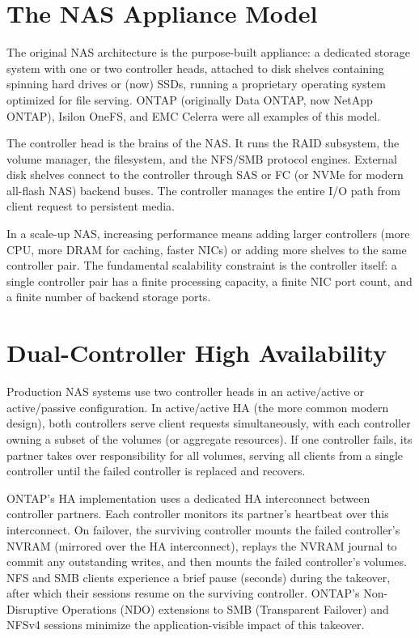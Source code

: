 \section{The NAS Appliance Model}
The original NAS architecture is the purpose-built appliance: a dedicated storage system with one or two controller heads, attached to disk shelves containing spinning hard drives or (now) SSDs, running a proprietary operating system optimized for file serving. ONTAP (originally Data ONTAP, now NetApp ONTAP), Isilon OneFS, and EMC Celerra were all examples of this model.

The controller head is the brains of the NAS. It runs the RAID subsystem, the volume manager, the filesystem, and the NFS/SMB protocol engines. External disk shelves connect to the controller through SAS or FC (or NVMe for modern all-flash NAS) backend buses. The controller manages the entire I/O path from client request to persistent media.

In a scale-up NAS, increasing performance means adding larger controllers (more CPU, more DRAM for caching, faster NICs) or adding more shelves to the same controller pair. The fundamental scalability constraint is the controller itself: a single controller pair has a finite processing capacity, a finite NIC port count, and a finite number of backend storage ports.

\section{Dual-Controller High Availability}
Production NAS systems use two controller heads in an active/active or active/passive configuration. In active/active HA (the more common modern design), both controllers serve client requests simultaneously, with each controller owning a subset of the volumes (or aggregate resources). If one controller fails, its partner takes over responsibility for all volumes, serving all clients from a single controller until the failed controller is replaced and recovers.

ONTAP's HA implementation uses a dedicated HA interconnect between controller partners. Each controller monitors its partner's heartbeat over this interconnect. On failover, the surviving controller mounts the failed controller's NVRAM (mirrored over the HA interconnect), replays the NVRAM journal to commit any outstanding writes, and then mounts the failed controller's volumes. NFS and SMB clients experience a brief pause (seconds) during the takeover, after which their sessions resume on the surviving controller. ONTAP's Non-Disruptive Operations (NDO) extensions to SMB (Transparent Failover) and NFSv4 sessions minimize the application-visible impact of this takeover.

